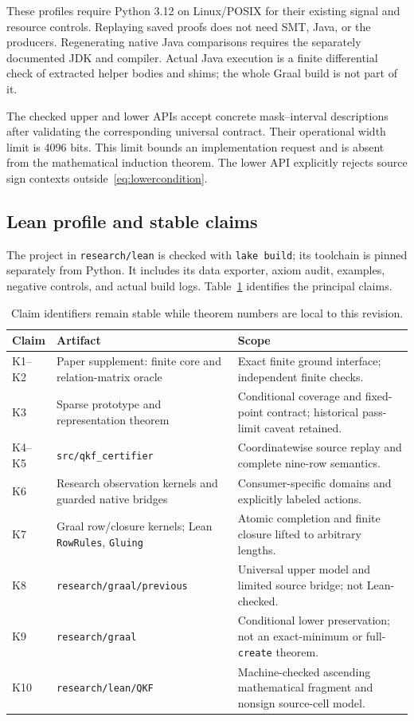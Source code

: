 These profiles require Python 3.12 on Linux/POSIX for their existing signal and resource controls. Replaying saved proofs does not need SMT, Java, or the producers. Regenerating native Java comparisons requires the separately documented JDK and compiler. Actual Java execution is a finite differential check of extracted helper bodies and shims; the whole Graal build is not part of it.

The checked upper and lower APIs accept concrete mask--interval descriptions after validating the corresponding universal contract. Their operational width limit is 4096 bits. This limit bounds an implementation request and is absent from the mathematical induction theorem. The lower API explicitly rejects source sign contexts outside~\eqref{eq:lowercondition}.

\subsection{Lean profile and stable claims}
The project in \texttt{research/lean} is checked with \texttt{lake build}; its toolchain is pinned separately from Python. It includes its data exporter, axiom audit, examples, negative controls, and actual build logs. Table~\ref{tab:traceability} identifies the principal claims.

\begin{table}[htbp]\small
\begin{tabularx}{\textwidth}{@{}>{\raggedright\arraybackslash}p{}XX@{}}
\toprule
Claim & Artifact & Scope\\
\midrule
K1--K2 & Paper supplement: finite core and relation-matrix oracle & Exact finite ground interface; independent finite checks.\\
K3 & Sparse prototype and representation theorem & Conditional coverage and fixed-point contract; historical pass-limit caveat retained.\\
K4--K5 & \texttt{src/qkf\_certifier} & Coordinatewise source replay and complete nine-row semantics.\\
K6 & Research observation kernels and guarded native bridges & Consumer-specific domains and explicitly labeled actions.\\
K7 & Graal row/closure kernels; Lean \texttt{RowRules}, \texttt{Gluing} & Atomic completion and finite closure lifted to arbitrary lengths.\\
K8 & \texttt{research/graal/previous} & Universal upper model and limited source bridge; not Lean-checked.\\
K9 & \texttt{research/graal} & Conditional lower preservation; not an exact-minimum or full-\texttt{create} theorem.\\
K10 & \texttt{research/lean/QKF} & Machine-checked ascending mathematical fragment and nonsign source-cell model.\\
\bottomrule
\end{tabularx}
\caption{Claim identifiers remain stable while theorem numbers are local to this revision.}\label{tab:traceability}
\end{table}

